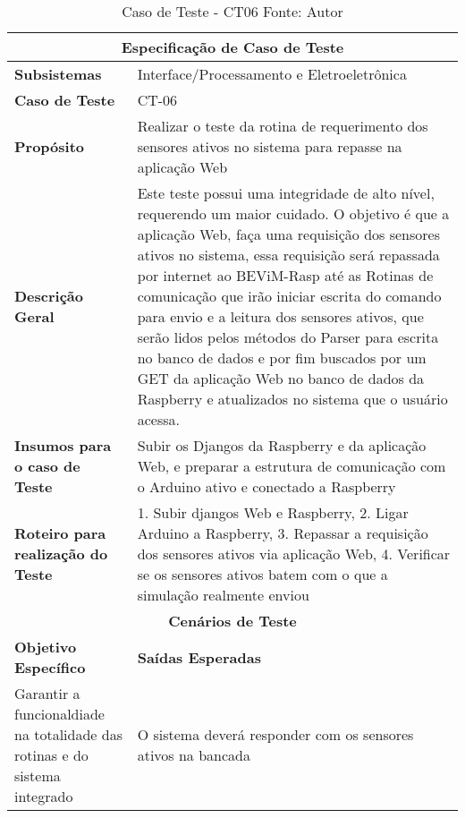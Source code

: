 \begin{table}[H]
    \begin{center}
        \begin{tabular}{|p{5cm}|p{12cm}|}
            \hline
            \multicolumn{2}{|c|}{\textbf{Especificação de Caso de Teste}} \\ \hline
                \textbf{Subsistemas}                               & Interface/Processamento e Eletroeletrônica \\ \hline
                \textbf{Caso de Teste}                             & CT-06 \\ \hline
                \textbf{Propósito}                                     & Realizar o teste da rotina de requerimento dos sensores ativos no sistema para repasse na aplicação Web \\ \hline
                \textbf{Descrição Geral}                           & Este teste possui uma integridade de alto nível, requerendo um maior cuidado. O objetivo é que a aplicação Web, faça uma requisição dos sensores ativos no sistema, essa requisição será repassada por internet ao BEViM-Rasp até as Rotinas de comunicação que irão iniciar escrita do comando para envio e a leitura dos sensores ativos, que serão lidos pelos métodos do Parser para escrita no banco de dados e por fim buscados por um GET da aplicação Web no banco de dados da Raspberry e atualizados no sistema que o usuário acessa. \\ \hline
                \textbf{Insumos para o caso de Teste}    & Subir os Djangos da Raspberry e da aplicação Web, e preparar a estrutura de comunicação com o Arduino ativo e conectado a Raspberry \\ \hline
                \textbf{Roteiro para realização do Teste}&  1. Subir djangos Web e Raspberry, 2. Ligar Arduino a Raspberry, 3. Repassar a requisição dos sensores ativos via aplicação Web, 4. Verificar se os sensores ativos batem com o que a simulação realmente enviou \\ \hline
            \multicolumn{2}{|c|}{\textbf{Cenários de Teste}} \\ \hline
                \textbf{Objetivo Específico}                      & \textbf{Saídas Esperadas} \\ \hline
                Garantir a funcionaldiade na totalidade das rotinas e do sistema integrado & O sistema deverá responder com os sensores ativos na bancada\\ \hline
        \end{tabular}
    \end{center}
    \caption[Caso de Teste - CT06]{Caso de Teste - CT06
    \protect Fonte: Autor}
    \label{CT-06}
\end{table}

